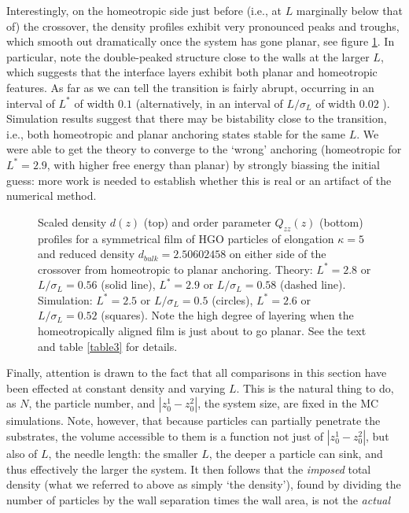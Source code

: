 \documentclass[aps,pre,twocolumn,groupedaddress,showpacs]{revtex4}
\newlength{\picW}	%
\newcommand{\picB}[1]{\fbox{\texttt{[image: \#1]}}}
\begin{document}
Interestingly, on the homeotropic side just before (i.e., at $L$ marginally 
below that of) the crossover, the density profiles exhibit very pronounced 
peaks and troughs, which smooth out dramatically once the system has gone 
planar, see figure \ref{fig5}. In particular, note the double-peaked structure
close to the walls at the larger $L$, which suggests that the interface
layers exhibit both planar and homeotropic features. As far as we can tell 
the transition is fairly abrupt, occurring in an interval of $L^*$ of width 
$0.1$ (alternatively, in an interval of $L/\sigma_L$ of width $0.02$ ).
Simulation results suggest \cite{Barmes:2003} that there may be bistability 
close to the transition, i.e., both homeotropic and planar anchoring states
stable for the same $L$. We were able to get the theory to converge to the 
`wrong' anchoring (homeotropic for $L^*=2.9$, with higher free energy than 
planar) by strongly biassing the initial guess: more work is needed to 
establish whether this is real or an artifact of the numerical method.\\
\picW=8cm
\begin{figure}
	\picB{bigbridfig5.eps}
	\caption{Scaled density $d(z)$ (top) and order parameter $Q_{zz}(z)$ (bottom)
	profiles for a symmetrical film of HGO particles of elongation $\kappa=5$ and 
	reduced density $d_{bulk}=2.50602458$ on either side of the crossover from 
	homeotropic to planar anchoring. Theory: $L^*=2.8$ or $L/\sigma_L=0.56$ (solid 
	line), $L^*=2.9$ or $L/\sigma_L=0.58$ (dashed line). Simulation: $L^*=2.5$ or
	$L/\sigma_L=0.5$ (circles), $L^*=2.6$ or $L/\sigma_L=0.52$ (squares). Note the 
	high degree of layering when the homeotropically aligned film is just about 
	to go planar. See the text and table \protect\ref{table3} for details.}
	\label{fig5}
\end{figure}
Finally, attention is drawn to the fact that all comparisons in this section 
have been effected at constant density and varying $L$. This is the natural 
thing to do, as $N$, the particle number, and $|z_0^1-z_0^2|$, the system 
size, are fixed in the MC simulations. Note, however, that because particles
can partially penetrate the substrates, the volume accessible to them is a 
function not just of $|z_0^1-z_0^2|$, but also of $L$, the needle length: the 
smaller $L$, the deeper a particle can sink, and thus effectively the larger
the system. It then follows that the {\it imposed} total density (what we 
referred to above as simply `the density'), found by dividing the number of 
particles by the wall separation times the wall area, is not the {\it actual} 
\end{document}
